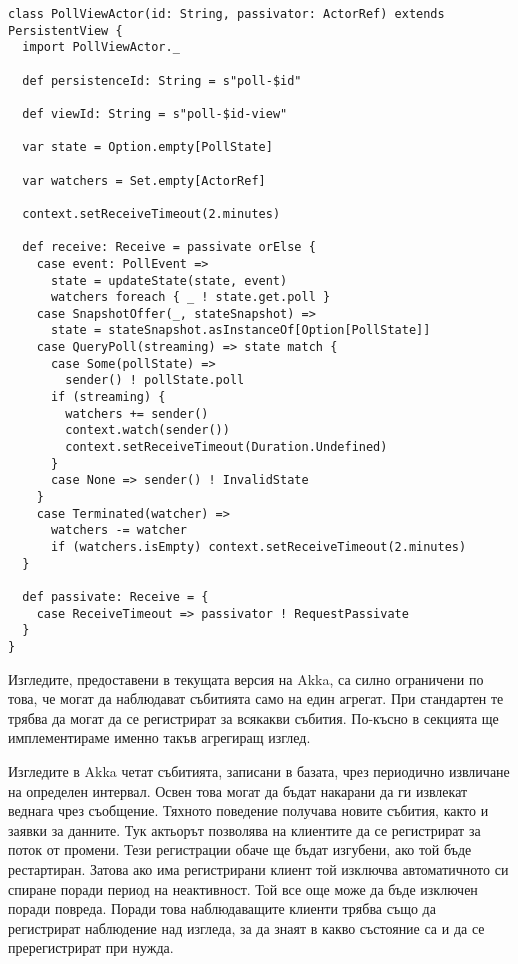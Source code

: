 \begin{lstlisting}[style=listing, caption={Изглед на анкета}]
class PollViewActor(id: String, passivator: ActorRef) extends PersistentView {
  import PollViewActor._
  
  def persistenceId: String = s"poll-$id"
  
  def viewId: String = s"poll-$id-view"
  
  var state = Option.empty[PollState]
  
  var watchers = Set.empty[ActorRef]
  
  context.setReceiveTimeout(2.minutes)
  
  def receive: Receive = passivate orElse {
    case event: PollEvent =>
      state = updateState(state, event)
      watchers foreach { _ ! state.get.poll }
    case SnapshotOffer(_, stateSnapshot) =>
      state = stateSnapshot.asInstanceOf[Option[PollState]]
    case QueryPoll(streaming) => state match {
      case Some(pollState) =>
        sender() ! pollState.poll
      if (streaming) {
        watchers += sender()
        context.watch(sender())
        context.setReceiveTimeout(Duration.Undefined)
      }
      case None => sender() ! InvalidState
    }
    case Terminated(watcher) =>
      watchers -= watcher
      if (watchers.isEmpty) context.setReceiveTimeout(2.minutes)
  }
  
  def passivate: Receive = {
    case ReceiveTimeout => passivator ! RequestPassivate
  }   
}
\end{lstlisting}

Изгледите, предоставени в текущата версия на Akka, са силно ограничени по това, че могат да наблюдават събитията само на един агрегат. При стандартен  те трябва да могат да се регистрират за всякакви събития. По-късно в секцията ще имплементираме именно такъв агрегиращ изглед.

Изгледите в Akka четат събитията, записани в базата, чрез периодично извличане на определен интервал. Освен това могат да бъдат накарани да ги извлекат веднага чрез  съобщение. Тяхното  поведение получава новите събития, както и заявки за данните. Тук актьорът позволява на клиентите да се регистрират за поток от промени. Тези регистрации обаче ще бъдат изгубени, ако той бъде рестартиран. Затова ако има регистрирани клиент той изключва автоматичното си спиране поради период на неактивност. Той все още може да бъде изключен поради повреда. Поради това наблюдаващите клиенти трябва също да регистрират  наблюдение над изгледа, за да знаят в какво състояние са и да се пререгистрират при нужда.

